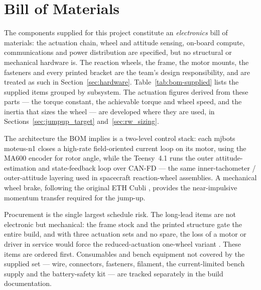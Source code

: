 \section{Bill of Materials}
\label{app:bom}

The components supplied for this project constitute an \emph{electronics} bill of
materials: the actuation chain, wheel and attitude sensing, on-board compute,
communications and power distribution are specified, but no structural or
mechanical hardware is. The reaction wheels, the frame, the motor mounts, the
fasteners and every printed bracket are the team's design responsibility, and are
treated as such in Section~\ref{sec:hardware}. Table~\ref{tab:bom-supplied} lists
the supplied items grouped by subsystem. The actuation figures derived from these
parts --- the torque constant, the achievable torque and wheel speed, and the
inertia that sizes the wheel --- are developed where they are used, in
Sections~\ref{sec:jumpup_target} and~\ref{sec:rw_sizing}.

The architecture the BOM implies is a two-level control stack: each mjbots
moteus-n1 closes a high-rate field-oriented current loop on its motor, using the
MA600 encoder for rotor angle, while the Teensy~4.1 runs the outer
attitude-estimation and state-feedback loop over CAN-FD --- the same
inner-tachometer / outer-attitude layering used in spacecraft reaction-wheel
assemblies. A mechanical wheel brake, following the original ETH Cubli
\cite{gajamohan2013cubli}, provides the near-impulsive momentum transfer required
for the jump-up.

Procurement is the single largest schedule risk. The long-lead items are not
electronic but mechanical: the frame stock and the printed structure gate the
entire build, and with three actuation sets and no spare, the loss of a motor
or driver in service would force the reduced-actuation one-wheel variant
\cite{hofer2023onewheelcubli}. These items are ordered first. Consumables and
bench equipment not covered by the supplied set --- wire, connectors,
fasteners, filament, the current-limited bench supply and the battery-safety
kit --- are tracked separately in the build documentation.

